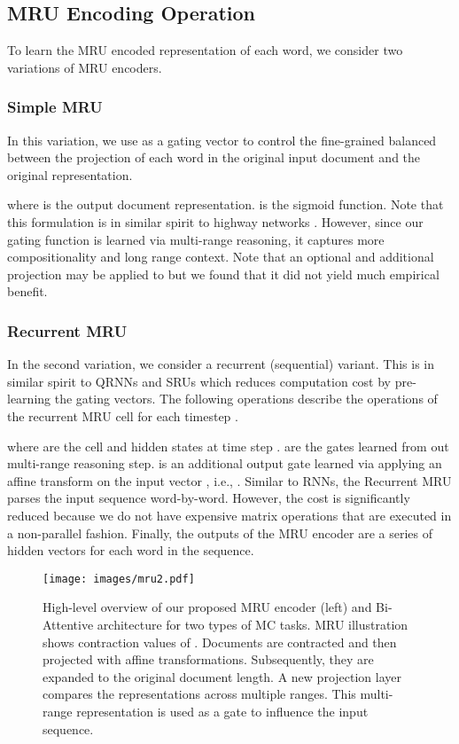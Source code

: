 \documentclass{article}
\begin{document}
\subsection{MRU Encoding Operation}
To learn the \textsc{MRU} encoded representation of each word, we consider two variations of MRU encoders. 
\subsubsection{Simple MRU}
In this variation, we use  as a gating vector to control the fine-grained balanced between the projection of each word  in the original input document and the original representation. 

where  is the output document representation.  is the sigmoid function. Note that this formulation is in similar spirit to highway networks \cite{DBLP:journals/corr/SrivastavaGS15}. However, since our gating function is learned via multi-range reasoning, it captures more compositionality and long range context. Note that an optional and additional projection may be applied to  but we found that it did not yield much empirical benefit. 

\subsubsection{Recurrent MRU}
In the second variation, we consider a recurrent (sequential) variant. This is in similar spirit to QRNNs \cite{DBLP:journals/corr/BradburyMXS16} and SRUs \cite{lei2017training} which reduces computation cost by pre-learning the gating vectors. The following operations describe the operations of the recurrent MRU cell for each timestep .

where  are the cell and hidden states at time step .  are the gates learned from out multi-range reasoning step.  is an additional output gate learned via applying an affine transform on the input vector , i.e., . Similar to RNNs, the Recurrent MRU parses the input sequence word-by-word. However, the cost is significantly reduced because we do not have expensive matrix operations that are executed in a non-parallel fashion. Finally, the outputs of the MRU encoder are a series of hidden vectors  for each word in the sequence. 
\begin{figure}[ht]
  \centering
    \texttt{[image: images/mru2.pdf]}
    \caption{High-level overview of our proposed \textsc{MRU} encoder (left) and Bi-Attentive architecture for two types of MC tasks. MRU illustration shows contraction values of . Documents are contracted and then projected with affine transformations. Subsequently, they are expanded to the original document length. A new projection layer compares the representations across multiple ranges. This multi-range representation is used as a gate to influence the input sequence.}

    \label{fig:high_level}
\end{figure}
\end{document}
